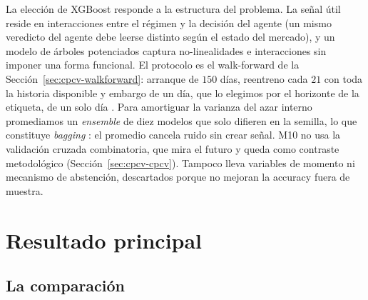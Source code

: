 La elección de XGBoost responde a la estructura del problema. La señal útil reside en interacciones entre el régimen y la decisión del agente (un mismo veredicto del agente debe leerse distinto según el estado del mercado), y un modelo de árboles potenciados captura no-linealidades e interacciones sin imponer una forma funcional. El protocolo es el walk-forward de la Sección~\ref{sec:cpcv-walkforward}: arranque de $150$ días, reentreno cada $21$ con toda la historia disponible y embargo de un día, que lo elegimos por el horizonte de la etiqueta, de un solo día \cite{tashman2000, lopezdeprado2018}. Para amortiguar la varianza del azar interno promediamos un \emph{ensemble} de diez modelos que solo difieren en la semilla, lo que constituye \emph{bagging} \cite{breiman1996, dietterich2000}: el promedio cancela ruido sin crear señal. M10 no usa la validación cruzada combinatoria, que mira el futuro y queda como contraste metodológico (Sección~\ref{sec:cpcv-cpcv}). Tampoco lleva variables de momento ni mecanismo de abstención, descartados porque no mejoran la accuracy fuera de muestra.

\section{Resultado principal}
\label{sec:smci-resultado}

\subsection{La comparación}
\label{sec:smci-comparacion}

